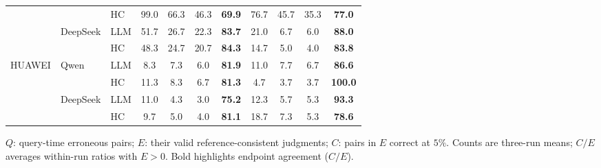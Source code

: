 \begin{table}[!htbp]
\begin{minipage}{\linewidth}
\begin{tabular*}{\linewidth}{@{\extracolsep{\fill}}lll*{3}{S[table-format=3.1]}@{\hspace{5pt}}S[table-format=3.1]@{\hspace{9pt}}*{3}{S[table-format=3.1]}@{\hspace{5pt}}S[table-format=3.1]@{}}
 &  & HC & 99.0 & 66.3 & 46.3 & \bfseries 69.9 & 76.7 & 45.7 & 35.3 & \bfseries 77.0 \\
\addlinespace[1.5pt]
 & DeepSeek & LLM & 51.7 & 26.7 & 22.3 & \bfseries 83.7 & 21.0 & 6.7 & 6.0 & \bfseries 88.0 \\
 &  & HC & 48.3 & 24.7 & 20.7 & \bfseries 84.3 & 14.7 & 5.0 & 4.0 & \bfseries 83.8 \\
\midrule
HUAWEI & Qwen & LLM & 8.3 & 7.3 & 6.0 & \bfseries 81.9 & 11.0 & 7.7 & 6.7 & \bfseries 86.6 \\
 &  & HC & 11.3 & 8.3 & 6.7 & \bfseries 81.3 & 4.7 & 3.7 & 3.7 & \bfseries 100.0 \\
\addlinespace[1.5pt]
 & DeepSeek & LLM & 11.0 & 4.3 & 3.0 & \bfseries 75.2 & 12.3 & 5.7 & 5.3 & \bfseries 93.3 \\
 &  & HC & 9.7 & 5.0 & 4.0 & \bfseries 81.1 & 18.7 & 7.3 & 5.3 & \bfseries 78.6 \\
\bottomrule
\end{tabular*}
\endgroup
\par\vspace{2pt}
{\fontsize{8}{9.2}\selectfont\raggedright $Q$: query-time erroneous pairs; $E$: their valid reference-consistent judgments; $C$: pairs in $E$ correct at $5\%$. Counts are three-run means; $C/E$ averages within-run ratios with $E>0$. Bold highlights endpoint agreement ($C/E$).\par}
\end{minipage}
\end{table}
